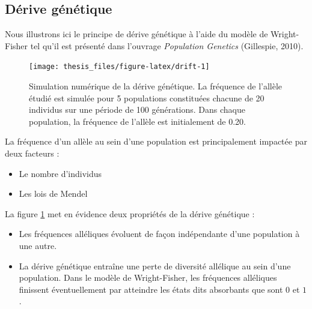 \documentclass[12pt,twoside]{reedthesis}
\begin{document}
  \subsection{Dérive génétique}\label{derive-genetique}
  
  Nous illustrons ici le principe de dérive génétique à l'aide du modèle
  de Wright-Fisher tel qu'il est présenté dans l'ouvrage
  \textit{Population Genetics} (Gillespie, 2010).
  
  \begin{figure}
  
  {\centering \texttt{[image: thesis\_files/figure-latex/drift-1]} 
  
  }
  
  \caption{Simulation numérique de la dérive génétique. La fréquence de l'allèle étudié est simulée pour 5 populations constituées chacune de 20 individus sur une période de 100 générations. Dans chaque population, la fréquence de l'allèle est initialement de 0.20.}\label{fig:drift}
  \end{figure}
  
  La fréquence d'un allèle au sein d'une population est principalement
  impactée par deux facteurs :
  
  \begin{itemize}
  \item
    Le nombre d'individus
  \item
    Les lois de Mendel
  \end{itemize}
  
  La figure \ref{fig:drift} met en évidence deux propriétés de la dérive
  génétique :
  
  \begin{itemize}
  \item
    Les fréquences alléliques évoluent de façon indépendante d'une
    population à une autre.
  \item
    La dérive génétique entraîne une perte de diversité allélique au sein
    d'une population. Dans le modèle de Wright-Fisher, les fréquences
    alléliques finissent éventuellement par atteindre les états dits
    absorbants que sont \(0\) et \(1\).
  \end{itemize}
  
\end{document}
